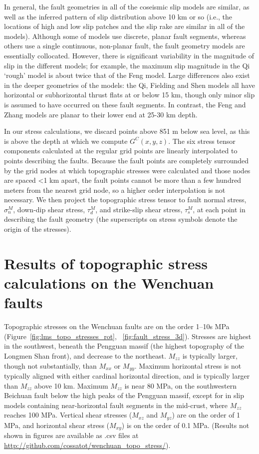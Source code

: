 \documentclass[draft,jgrga]{AGUTeX}
\begin{document}
\begin{article}
In general, the fault geometries in all of the coseismic slip models are
similar, as well as the inferred pattern of slip distribution above 10 km or
so (i.e., the locations of high and low slip patches and the slip rake are
similar in all of the models).  Although some of models use discrete, planar
fault segments, whereas others use a single continuous, non-planar fault, the
fault geometry models are essentially collocated. However, there is significant
variability in the magnitude of slip in the different models; for example, the
maximum slip magnitude in the Qi `rough' model is about twice that of the
Feng model. Large differences also exist in the deeper geometries of the
models: the Qi, Fielding and Shen models all have horizontal or subhorizontal
thrust flats at or below 15 km, though only minor slip is assumed to have
occurred on these fault segments. In contrast, the Feng and Zhang models are
planar to their lower end at 25-30 km depth.

In our stress calculations, we discard
points above 851 m below sea level, as this is above the depth at which
we compute $G^C(x,y,z)$. The six stress tensor components calculated at
the regular grid points are linearly interpolated to points describing
the faults. Because the fault points are completely surrounded by the
grid nodes at which topographic stresses were calculated and those nodes
are spaced \textless{}1 km apart, the fault points cannot be more than a
few hundred meters from the nearest grid node, so a higher order
interpolation is not necessary. We then project the topographic stress
tensor to fault normal stress, $\sigma_n^M$, down-dip shear stress,
$\tau_d^M$, and strike-slip shear stress, $\tau_s^M$, at each point in
describing the fault geometry (the superscripts on stress
symbols denote the origin of the stresses).

\section{Results of topographic stress calculations on the Wenchuan
faults}\label{results-of-topographic-stress-calculations-on-the-wenchuan-faults}

Topographic stresses on the Wenchuan faults are on the order 1--10s MPa
(Figure~\ref{fig:lms_topo_stresses_rot}, ~\ref{fig:fault_stress_3d}). 
Stresses are highest in the southwest,
beneath the Pengguan massif (the highest topography of the Longmen Shan
front), and decrease to the northeast. $M_{zz}$ is typically larger,
though not substantially, than $M_{xx}$ or $M_{yy}$. Maximum horizontal
stress is not typically aligned with either cardinal horizontal
direction, and is typically larger than $M_{zz}$ above 10 km. Maximum
$M_{zz}$ is near 80 MPa, on the southwestern Beichuan fault below the
high peaks of the Pengguan massif, except for in slip models containing
near-horizontal fault segments in the mid-crust, where $M_{zz}$ reaches
100 MPa. Vertical shear stresses ($M_{xz}$ and $M_{yz}$) are on the
order of 1 MPa, and horizontal shear stress ($M_{xy}$) is on the order
of 0.1 MPa. (Results not shown in figures are available as .csv files
at \url{http://github.com/cossatot/wenchuan_topo_stress/}).


\end{article}
\end{document}
